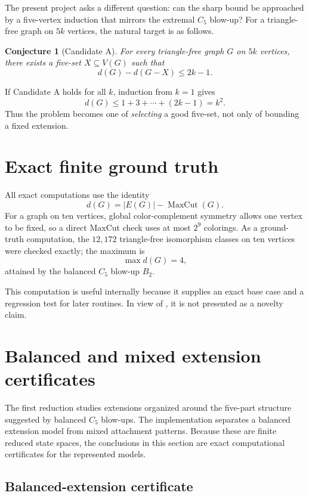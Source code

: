 \documentclass[11pt]{article}
\newtheorem{conjecture}{Conjecture}
\newcommand{\mc}{\operatorname{MaxCut}}
\newcommand{\dd}{d}
\begin{document}
The present project asks a different question: can the sharp bound be
approached by a five-vertex induction that mirrors the extremal $C_5$
blow-up?  For a triangle-free graph on $5k$ vertices, the natural target is
as follows.

\begin{conjecture}[Candidate A]
For every triangle-free graph $G$ on $5k$ vertices, there exists a
five-set $X\subseteq V(G)$ such that
\[
\dd(G)-\dd(G-X)\le 2k-1.
\]
\end{conjecture}

If Candidate A holds for all $k$, induction from $k=1$ gives
\[
\dd(G)\le 1+3+\cdots+(2k-1)=k^2.
\]
Thus the problem becomes one of \emph{selecting} a good five-set, not only
of bounding a fixed extension.

\section{Exact finite ground truth}

All exact computations use the identity
\[
\dd(G)=|E(G)|-\mc(G).
\]
For a graph on ten vertices, global color-complement symmetry allows one
vertex to be fixed, so a direct MaxCut check uses at most $2^9$ colorings.
As a ground-truth computation, the $12{,}172$ triangle-free isomorphism
classes on ten vertices were checked exactly; the maximum is
\[
\max \dd(G)=4,
\]
attained by the balanced $C_5$ blow-up $B_2$.

This computation is useful internally because it supplies an exact base
case and a regression test for later routines.  In view of \cite{Ferudun},
it is not presented as a novelty claim.

\section{Balanced and mixed extension certificates}
\label{sec:extensions}

The first reduction studies extensions organized around the five-part
structure suggested by balanced $C_5$ blow-ups.  The implementation
separates a balanced extension model from mixed attachment patterns.
Because these are finite reduced state spaces, the conclusions in this
section are exact computational certificates for the represented models.

\subsection{Balanced-extension certificate}
\end{document}
